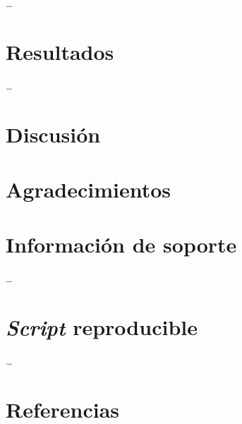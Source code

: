 \documentclass[11pt,]{article}
\begin{document}
\ldots

\hypertarget{resultados}{%
\section{Resultados}\label{resultados}}

\ldots

\hypertarget{discusiuxf3n}{%
\section{Discusión}\label{discusiuxf3n}}

\hypertarget{agradecimientos}{%
\section{Agradecimientos}\label{agradecimientos}}

\hypertarget{informaciuxf3n-de-soporte}{%
\section{Información de soporte}\label{informaciuxf3n-de-soporte}}

\ldots

\hypertarget{script-reproducible}{%
\section{\texorpdfstring{\emph{Script}
reproducible}{Script reproducible}}\label{script-reproducible}}

\ldots

\hypertarget{referencias}{%
\section{Referencias}\label{referencias}}




\newpage
\singlespacing 
\end{document}
